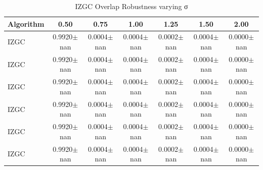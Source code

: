 \begin{table}[ht!]
\centering
\caption{IZGC Overlap Robustness varying σ}
\label{tab:izgc_overlap_sigma}
\begin{tabular*}{\linewidth}{@{} lcccccc @{}}
\toprule
Algorithm & 0.50 & 0.75 & 1.00 & 1.25 & 1.50 & 2.00 \\
\midrule
IZGC & 0.9920$\pm$nan & 0.0004$\pm$nan & 0.0004$\pm$nan & 0.0002$\pm$nan & 0.0004$\pm$nan & 0.0000$\pm$nan \\
IZGC & 0.9920$\pm$nan & 0.0004$\pm$nan & 0.0004$\pm$nan & 0.0002$\pm$nan & 0.0004$\pm$nan & 0.0000$\pm$nan \\
IZGC & 0.9920$\pm$nan & 0.0004$\pm$nan & 0.0004$\pm$nan & 0.0002$\pm$nan & 0.0004$\pm$nan & 0.0000$\pm$nan \\
IZGC & 0.9920$\pm$nan & 0.0004$\pm$nan & 0.0004$\pm$nan & 0.0002$\pm$nan & 0.0004$\pm$nan & 0.0000$\pm$nan \\
IZGC & 0.9920$\pm$nan & 0.0004$\pm$nan & 0.0004$\pm$nan & 0.0002$\pm$nan & 0.0004$\pm$nan & 0.0000$\pm$nan \\
IZGC & 0.9920$\pm$nan & 0.0004$\pm$nan & 0.0004$\pm$nan & 0.0002$\pm$nan & 0.0004$\pm$nan & 0.0000$\pm$nan \\
\bottomrule
\end{tabular*}
\end{table}